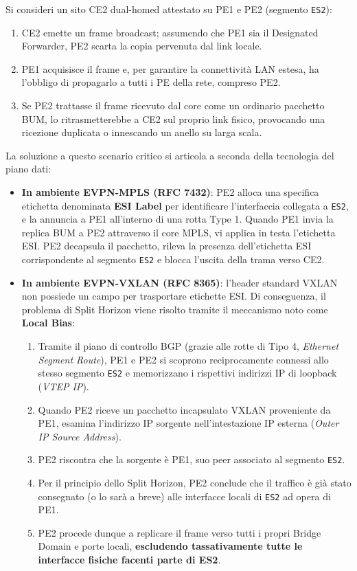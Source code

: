\documentclass[11pt, a4paper]{article}
\begin{document}
Si consideri un sito CE2 dual-homed attestato su PE1 e PE2 (segmento \texttt{ES2}):
\begin{enumerate}
    \item CE2 emette un frame broadcast; assumendo che PE1 sia il Designated Forwarder, PE2 scarta la copia pervenuta dal link locale.
    \item PE1 acquisisce il frame e, per garantire la connettività LAN estesa, ha l'obbligo di propagarlo a tutti i PE della rete, compreso PE2.
    \item Se PE2 trattasse il frame ricevuto dal core come un ordinario pacchetto BUM, lo ritrasmetterebbe a CE2 sul proprio link fisico, provocando una ricezione duplicata o innescando un anello su larga scala.
\end{enumerate}

La soluzione a questo scenario critico si articola a seconda della tecnologia del piano dati:
\begin{itemize}
    \item \textbf{In ambiente EVPN-MPLS (RFC 7432)}: PE2 alloca una specifica etichetta denominata \textbf{ESI Label} per identificare l'interfaccia collegata a \texttt{ES2}, e la annuncia a PE1 all'interno di una rotta Type 1. Quando PE1 invia la replica BUM a PE2 attraverso il core MPLS, vi applica in testa l'etichetta ESI. PE2 decapsula il pacchetto, rileva la presenza dell'etichetta ESI corrispondente al segmento \texttt{ES2} e blocca l'uscita della trama verso CE2.
    \item \textbf{In ambiente EVPN-VXLAN (RFC 8365)}: l'header standard VXLAN non possiede un campo per trasportare etichette ESI. Di conseguenza, il problema di Split Horizon viene risolto tramite il meccanismo noto come \textbf{Local Bias}:
    \begin{enumerate}[noitemsep]
        \item Tramite il piano di controllo BGP (grazie alle rotte di Tipo 4, \emph{Ethernet Segment Route}), PE1 e PE2 si scoprono reciprocamente connessi allo stesso segmento \texttt{ES2} e memorizzano i rispettivi indirizzi IP di loopback (\emph{VTEP IP}).
        \item Quando PE2 riceve un pacchetto incapsulato VXLAN proveniente da PE1, esamina l'indirizzo IP sorgente nell'intestazione IP esterna (\emph{Outer IP Source Address}).
        \item PE2 riscontra che la sorgente è PE1, suo peer associato al segmento \texttt{ES2}.
        \item Per il principio dello Split Horizon, PE2 conclude che il traffico è già stato consegnato (o lo sarà a breve) alle interfacce locali di \texttt{ES2} ad opera di PE1.
        \item PE2 procede dunque a replicare il frame verso tutti i propri Bridge Domain e porte locali, \textbf{escludendo tassativamente tutte le interfacce fisiche facenti parte di ES2}.
    \end{enumerate}
\end{itemize}
\end{document}
